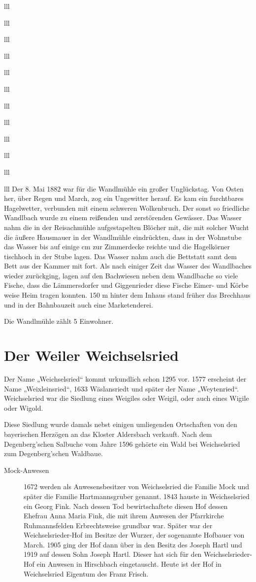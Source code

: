 \documentclass[12pt,a4pager]{book}
\begin{document}
\begin{tabuluar}{lll}
\begin{tabuluar}{lll}
\begin{tabuluar}{lll}
\begin{tabuluar}{lll}
\begin{tabuluar}{lll}
\begin{tabuluar}{lll}
\begin{tabuluar}{lll}
\begin{tabuluar}{lll}
\begin{tabuluar}{lll}
\begin{tabuluar}{lll}
\begin{tabuluar}{lll}
\begin{tabuluar}{lll}
Der 8. Mai 1882 war für die Wandlmühle ein großer Unglückstag. Von Osten her,
über Regen und March, zog ein Ungewitter herauf. Es kam ein furchtbares
Hagelwetter, verbunden mit einem schweren Wolkenbruch. Der sonst so friedliche
Wandlbach wurde zu einem reißenden und zerstörenden Gewässer. Das Wasser nahm
die in der Reisachmühle aufgestapelten Blöcher mit, die mit solcher Wucht die
äußere Hausmauer in der Wandlmühle eindrückten, dass in der Wohnstube das Wasser
bis auf einige cm zur Zimmerdecke reichte und die Hagelkörner tischhoch in der
Stube lagen. Das Wasser nahm auch die Bettstatt samt dem Bett aus der Kammer mit
fort. Als nach einiger Zeit das Wasser des Wandlbaches wieder zurückging, lagen
auf den Bachwiesen neben dem Wandlbache so viele Fische, dass die Lämmersdorfer
und Giggenrieder diese Fische Eimer- und Körbe weise Heim tragen konnten. 150 m
hinter dem Inhaus stand früher das Brechhaus und in der Bahnbauzeit auch eine
Marketenderei.

Die Wandlmühle zählt 5 Einwohner.

\section{Der Weiler Weichselsried}

Der Name „Weichselsried“ kommt urkundlich schon 1295 vor. 1577 erscheint der
Name „Weixleinsried“, 1633 Wäslansriedt und später der Name „Weytenried“.
Weichselsried war die Siedlung eines Weigiles oder Weigil, oder auch eines
Wigile oder Wigold.

Diese Siedlung wurde damals nebst einigen umliegenden Ortschaften von den
bayerischen Herzögen an das Kloster Aldersbach verkauft. Nach dem
Degenberg'schen Salbuche vom Jahre 1596 gehörte ein Wald bei Weichselsried zum
Degenberg'schen Waldbaue.

\begin{description}
\item[Mock-Anwesen] 1672 werden als Anwesensbesitzer von Weichselsried die
Familie Mock und später die Familie Hartmannsgruber genannt. 1843 hauste in
Weichselsried ein Georg Fink. Nach dessen Tod bewirtschaftete diesen Hof dessen
Ehefrau Anna Maria Fink, die mit ihrem Anwesen der Pfarrkirche Ruhmannsfelden
Erbrechtsweise grundbar war. Später war der Weichselsrieder-Hof im Besitze der
Wurzer, der sogenannte Hofbauer von March. 1905 ging der Hof dann über in den
Besitz des Joseph Hartl und 1919 auf dessen Sohn Joseph Hartl. Dieser hat sich
für den Weichselsrieder-Hof ein Anwesen in Hirschbach eingetauscht. Heute ist
der Hof in Weichselsried Eigentum des Franz Frisch.
\end{description}


\end{tabuluar}
\end{tabuluar}
\end{tabuluar}
\end{tabuluar}
\end{tabuluar}
\end{tabuluar}
\end{tabuluar}
\end{tabuluar}
\end{tabuluar}
\end{tabuluar}
\end{tabuluar}
\end{tabuluar}
\end{document}

